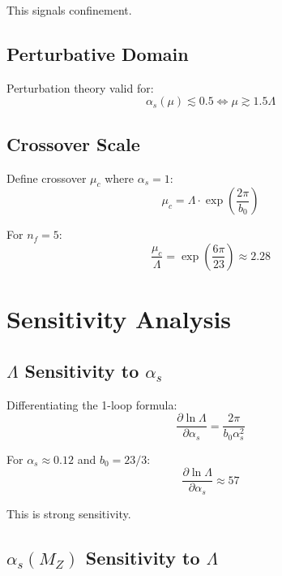 \documentclass[11pt,a4paper]{article}
\theoremstyle{definition}
\begin{document}
This signals confinement.

\subsection{Perturbative Domain}
\label{subsec:app-pert}

Perturbation theory valid for:
\begin{equation}
\label{eq:app-79}
\alpha_s(\mu) \lesssim 0.5 \iff \mu \gtrsim 1.5\Lambda
\end{equation}

\subsection{Crossover Scale}
\label{subsec:app-crossover}

Define crossover $\mu_c$ where $\alpha_s = 1$:
\begin{equation}
\label{eq:app-80}
\mu_c = \Lambda \cdot \exp\left(\frac{2\pi}{b_0}\right)
\end{equation}

For $n_f = 5$:
\begin{equation}
\label{eq:app-81}
\frac{\mu_c}{\Lambda} = \exp\left(\frac{6\pi}{23}\right) \approx 2.28
\end{equation}

\section{Sensitivity Analysis}
\label{app:sensitivity}

\subsection{$\Lambda$ Sensitivity to $\alpha_s$}
\label{subsec:app-sens-alpha}

Differentiating the 1-loop formula:
\begin{equation}
\label{eq:app-82}
\frac{\partial\ln\Lambda}{\partial\alpha_s} = \frac{2\pi}{b_0\alpha_s^2}
\end{equation}

For $\alpha_s \approx 0.12$ and $b_0 = 23/3$:
\begin{equation}
\label{eq:app-83}
\frac{\partial\ln\Lambda}{\partial\alpha_s} \approx 57
\end{equation}

This is strong sensitivity.

\subsection{$\alpha_s(M_Z)$ Sensitivity to $\Lambda$}
\label{subsec:app-sens-lambda}
\end{document}
